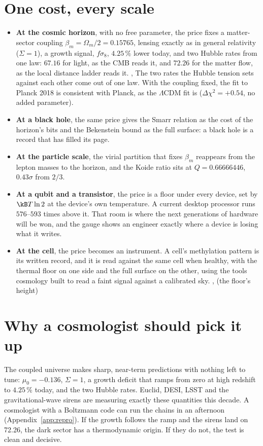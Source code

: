 \section*{One cost, every scale}
\begin{itemize}
\item \textbf{At the cosmic horizon}, with no free parameter, the price fixes a matter-sector coupling $\beta_m=\Omega_m/2=0.15765$, lensing
      exactly as in general relativity ($\Sigma=1$), a growth signal, $f\sigma_8$, $4.25\,\%$ lower today, and two Hubble rates from one law: $67.16$ for light,
      as the CMB reads it, and $72.26$ for the matter flow, as the local distance ladder reads it. \derived, \calc{} The two rates the
      Hubble tension sets against each other come out of one law. With the coupling fixed, the fit to Planck 2018 is consistent with Planck, as the $\Lambda$CDM fit is ($\Delta\chi^2=+0.54$, no added parameter). \measured
\item \textbf{At a black hole}, the same price gives the Smarr relation as the cost of the horizon's bits and the Bekenstein bound as the full
      surface: a black hole is a record that has filled its page. \derived
\item \textbf{At the particle scale}, the virial partition that fixes $\beta_m$ reappears from the lepton masses to the horizon, and the Koide
      ratio sits at $Q=0.66666446$, $0.43\sigma$ from $2/3$. \observed
\item \textbf{At a qubit and a transistor}, the price is a floor under every device, set by $\kB T\ln2$ at the device's own temperature. A current
      desktop processor runs $576$--$593$ times above it. \calc{} That room is where the next generations of hardware will be won, and the gauge shows
      an engineer exactly where a device is losing what it writes.
\item \textbf{At the cell}, the price becomes an instrument. A cell's methylation pattern is its written record, and it is read against the same
      cell when healthy, with the thermal floor on one side and the full surface on the other, using the tools cosmology built to read a faint
      signal against a calibrated sky. \derived, \measured{} (the floor's height)
\end{itemize}

\section*{Why a cosmologist should pick it up}
The coupled universe makes sharp, near-term predictions with nothing left to tune: $\mu_0=-0.136$, $\Sigma=1$, a growth deficit that ramps from
zero at high redshift to $4.25\,\%$ today, and the two Hubble rates. \prediction{} Euclid, DESI, LSST and the gravitational-wave sirens are
measuring exactly these quantities this decade. A cosmologist with a Boltzmann code can run the chains in an afternoon (Appendix~\ref{app:repro}).
If the growth follows the ramp and the sirens land on 72.26, the dark sector has a thermodynamic origin. If they do not, the test is clean and decisive.

